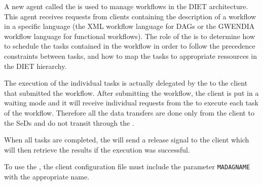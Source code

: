 A new agent called the \textit{\madag} is used to manage workflows
in the DIET architecture. This agent receives requests from clients
containing the description of a workflow in a specific language
(the \madag XML workflow language for DAGs or the GWENDIA workflow
language for functional workflows). The role of the \madag is to
determine how to schedule the tasks contained in the workflow in
order to follow the precedence constraints between tasks, and how to
map the tasks to appropriate ressources in the DIET hierarchy.

The execution of the individual tasks is actually delegated by the
\madag to the client that submitted the workflow. After submitting
the workflow, the client is put in a waiting mode and it will
receive individual requests from the \madag to execute each task
of the workflow. Therefore all the data transfers are done only
from the client to the SeDs and do not transit through the \madag.

When all tasks are completed, the \madag will send a release signal
to the client which will then retrieve the results if the execution
was successful.

To use the \madag, the client configuration file must include
the parameter \texttt{MADAGNAME} with the appropriate name.

